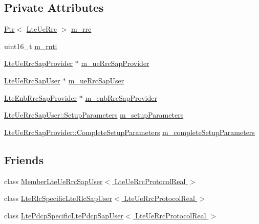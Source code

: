 \subsection*{Private Attributes}
\begin{DoxyCompactItemize}
\item 
\hyperlink{classns3_1_1Ptr}{Ptr}$<$ \hyperlink{classns3_1_1LteUeRrc}{Lte\+Ue\+Rrc} $>$ \hyperlink{classns3_1_1LteUeRrcProtocolReal_a8fdc7ce050a1325bac8fd0a851f22a1c}{m\+\_\+rrc}
\item 
uint16\+\_\+t \hyperlink{classns3_1_1LteUeRrcProtocolReal_a8474d4cb6038e0e43ee542f7ce7b193d}{m\+\_\+rnti}
\item 
\hyperlink{classns3_1_1LteUeRrcSapProvider}{Lte\+Ue\+Rrc\+Sap\+Provider} $\ast$ \hyperlink{classns3_1_1LteUeRrcProtocolReal_a1d594fbb2755388a84d4d1d53298b0f8}{m\+\_\+ue\+Rrc\+Sap\+Provider}
\item 
\hyperlink{classns3_1_1LteUeRrcSapUser}{Lte\+Ue\+Rrc\+Sap\+User} $\ast$ \hyperlink{classns3_1_1LteUeRrcProtocolReal_ac40d4cc4b269188defcbb5a051d86f05}{m\+\_\+ue\+Rrc\+Sap\+User}
\item 
\hyperlink{classns3_1_1LteEnbRrcSapProvider}{Lte\+Enb\+Rrc\+Sap\+Provider} $\ast$ \hyperlink{classns3_1_1LteUeRrcProtocolReal_a0293106f91668a44472470093622ad7b}{m\+\_\+enb\+Rrc\+Sap\+Provider}
\item 
\hyperlink{structns3_1_1LteUeRrcSapUser_1_1SetupParameters}{Lte\+Ue\+Rrc\+Sap\+User\+::\+Setup\+Parameters} \hyperlink{classns3_1_1LteUeRrcProtocolReal_a24fa403dd2ee0b111dc9ae7246f41a4b}{m\+\_\+setup\+Parameters}
\item 
\hyperlink{structns3_1_1LteUeRrcSapProvider_1_1CompleteSetupParameters}{Lte\+Ue\+Rrc\+Sap\+Provider\+::\+Complete\+Setup\+Parameters} \hyperlink{classns3_1_1LteUeRrcProtocolReal_af2e3a792e33d66096705cd4b9ad2534b}{m\+\_\+complete\+Setup\+Parameters}
\end{DoxyCompactItemize}
\subsection*{Friends}
\begin{DoxyCompactItemize}
\item 
class \hyperlink{classns3_1_1LteUeRrcProtocolReal_a64f1a6bafed5d06dba6b004b3f5dfb68}{Member\+Lte\+Ue\+Rrc\+Sap\+User$<$ Lte\+Ue\+Rrc\+Protocol\+Real $>$}
\item 
class \hyperlink{classns3_1_1LteUeRrcProtocolReal_af649da28c5b45fabbc1330ddcfeed4cb}{Lte\+Rlc\+Specific\+Lte\+Rlc\+Sap\+User$<$ Lte\+Ue\+Rrc\+Protocol\+Real $>$}
\item 
class \hyperlink{classns3_1_1LteUeRrcProtocolReal_ac8c537ec0cf400f4868b12b31c1f8cec}{Lte\+Pdcp\+Specific\+Lte\+Pdcp\+Sap\+User$<$ Lte\+Ue\+Rrc\+Protocol\+Real $>$}
\end{DoxyCompactItemize}

